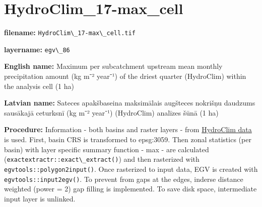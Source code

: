 \documentclass[
]{book}
\newcommand{\passthrough}[1]{#1}
\begin{document}
\section{HydroClim\_17-max\_cell}\label{ch06.086}

\textbf{filename:} \passthrough{\lstinline!HydroClim\_17-max\_cell.tif!}

\textbf{layername:} \passthrough{\lstinline!egv\_86!}

\textbf{English name:} Maximum per subcatchment upstream mean monthly precipitation amount (kg m⁻² year⁻¹) of the driest quarter (HydroClim) within the analysis cell (1 ha)

\textbf{Latvian name:} Sateces apakšbaseina maksimālais augšteces nokrišņu daudzums sausākajā ceturksnī (kg m⁻² year⁻¹) (HydroClim) analīzes šūnā (1 ha)

\textbf{Procedure:} Information - both basins and raster layers - from \hyperref[Ch04.12]{HydroClim data}
is used. First, basin CRS is transformed to epsg:3059. Then zonal statistics (per basin) with
layer specific summary function - max - are calculated (\passthrough{\lstinline!exactextractr::exact\_extract()!})
and then rasterized with \passthrough{\lstinline!egvtools::polygon2input()!}. Once rasterized to input data,
EGV is created with \passthrough{\lstinline!egvtools::input2egv()!}. To prevent from gaps at the edges,
inderse distance weighted (power = 2) gap filling is implemented. To save disk space,
intermediate input layer is unlinked.
\end{document}
